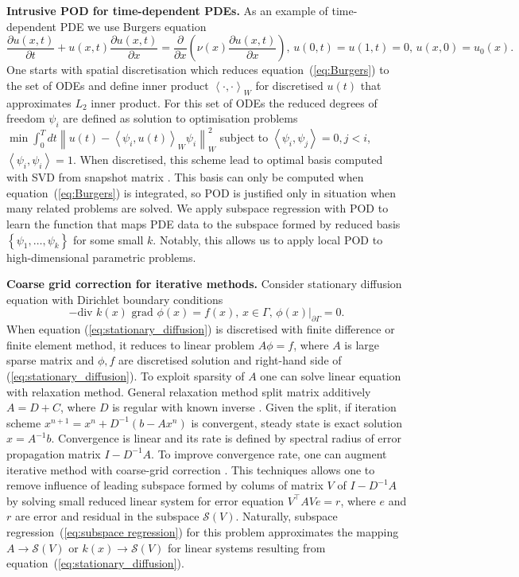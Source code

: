 \documentclass{article}
\begin{document}
\textbf{Intrusive POD for time-dependent PDEs.} As an example of time-dependent PDE we use Burgers equation
\begin{equation}
	\label{eq:Burgers}
	\frac{\partial u(x, t)}{\partial t} + u(x, t)\frac{\partial u(x, t)}{\partial x} = \frac{\partial}{\partial x}\left(\nu(x) \frac{\partial u(x, t)}{\partial x}\right),\,u(0, t) = u(1, t) = 0,\,u(x, 0) = u_0(x).
\end{equation}
One starts with spatial discretisation which reduces equation~(\ref{eq:Burgers}) to the set of ODEs and define inner product $\left<\cdot,\cdot\right>_{W}$ for discretised $u(t)$ that approximates $L_2$ inner product. For this set of ODEs the reduced degrees of freedom $\psi_i$ are defined as solution to optimisation problems $\min \int_{0}^{T}dt\left\|u(t) - \left<\psi_i, u(t)\right>_{W}\psi_i \right\|_{W}^2$ subject to $\left<\psi_i, \psi_j\right> = 0,j<i$, $\left<\psi_i, \psi_i\right> = 1$. When discretised, this scheme lead to optimal basis computed with SVD from snapshot matrix \cite{volkwein2013proper}. This basis can only be computed when equation~(\ref{eq:Burgers}) is integrated, so POD is justified only in situation when many related problems are solved. We apply subspace regression with POD to learn the function that maps PDE data to the subspace formed by reduced basis $\left\{\psi_1,\dots,\psi_{k}\right\}$ for some small $k$. Notably, this allows us to apply local POD to high-dimensional parametric problems.

\textbf{Coarse grid correction for iterative methods.} Consider stationary diffusion equation with Dirichlet boundary conditions
\begin{equation}
	\label{eq:stationary_diffusion}
	-\text{div }k(x)\text{ grad }\phi(x) = f(x),\,x\in\Gamma,\,\left.\phi(x)\right|_{\partial \Gamma} = 0.
\end{equation}
When equation (\ref{eq:stationary_diffusion}) is discretised with finite difference or finite element method, it reduces to linear problem $A \phi = f$, where $A$ is large sparse matrix and $\phi, f$ are discretised solution and right-hand side of (\ref{eq:stationary_diffusion}). To exploit sparsity of $A$ one can solve linear equation with relaxation method. General relaxation method split matrix additively $A = D + C$, where $D$ is regular with known inverse \cite{saad2003iterative}. Given the split, if iteration scheme $x^{n+1} = x^{n} + D^{-1}\left(b - Ax^{n}\right)$ is convergent, steady state is exact solution $x = A^{-1}b$. Convergence is linear and its rate is defined by spectral radius of error propagation matrix $I - D^{-1} A$. To improve convergence rate, one can augment iterative method with coarse-grid correction \cite{trottenberg2001multigrid}. This techniques allows one to remove influence of leading subspace formed by colums of matrix $V$ of $I - D^{-1} A$ by solving small reduced linear system for error equation $V^{\top} A V e = r$, where $e$ and $r$ are error and residual in the subspace $\mathcal{S}(V)$. Naturally, subspace regression~(\ref{eq:subspace regression}) for this problem approximates the mapping $A\rightarrow \mathcal{S}(V)$ or $k(x) \rightarrow \mathcal{S}(V)$ for linear systems resulting from equation~(\ref{eq:stationary_diffusion}).
\end{document}
